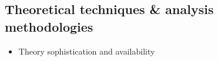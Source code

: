 \subsection{Theoretical techniques \& analysis methodologies}

\begin{itemize}
\item Theory sophistication and availability
\end{itemize}